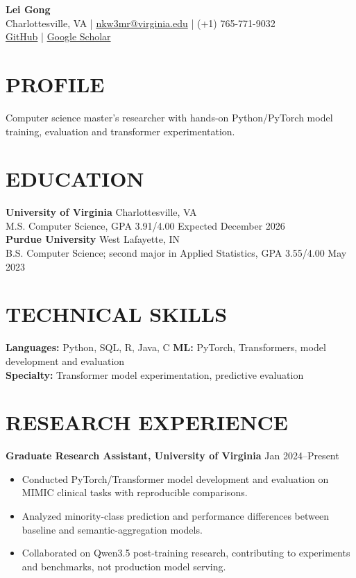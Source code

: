 \documentclass[10pt, letterpaper]{article}
\begin{document}
\setlength{\parindent}{0pt}
\begin{center}
{\fontsize{23}{25}\selectfont\textbf{Lei Gong}}\\[3pt]
Charlottesville, VA \quad | \quad \href{mailto:nkw3mr@virginia.edu}{nkw3mr@virginia.edu} \quad | \quad (+1) 765-771-9032\\[2pt]
\href{https://github.com/LeiGong0125Carrot}{GitHub} \quad | \quad \href{https://scholar.google.com/citations?user=8QLAkKMAAAAJ}{Google Scholar}
\end{center}
\vspace{-3mm}
\section{PROFILE}
Computer science master's researcher with hands-on Python/PyTorch model training, evaluation and transformer experimentation.
\section{EDUCATION}
\textbf{University of Virginia} \hfill Charlottesville, VA \\
M.S. Computer Science, GPA 3.91/4.00 \hfill Expected December 2026\\[1pt]
\textbf{Purdue University} \hfill West Lafayette, IN \\
B.S. Computer Science; second major in Applied Statistics, GPA 3.55/4.00 \hfill May 2023
\section{TECHNICAL SKILLS}
\textbf{Languages:} Python, SQL, R, Java, C \quad \textbf{ML:} PyTorch, Transformers, model development and evaluation\\
\textbf{Specialty:} Transformer model experimentation, predictive evaluation
\section{RESEARCH EXPERIENCE}
\textbf{Graduate Research Assistant, University of Virginia} \hfill Jan 2024--Present
\begin{itemize}
\item Conducted PyTorch/Transformer model development and evaluation on MIMIC clinical tasks with reproducible comparisons.
\item Analyzed minority-class prediction and performance differences between baseline and semantic-aggregation models.
\item Collaborated on Qwen3.5 post-training research, contributing to experiments and benchmarks, not production model serving.
\end{itemize}
\end{document}
